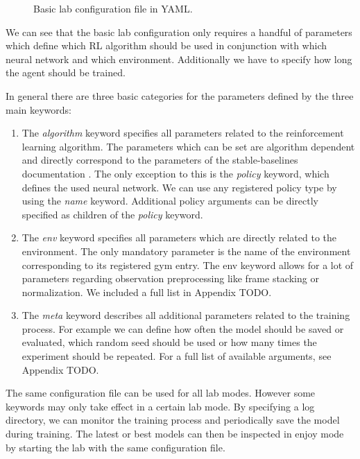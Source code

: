 \begin{figure}[h]
    
    \caption[Basic lab configuration file]{Basic lab configuration file in YAML.}
    \label{fig:BasicLabConfig}
\end{figure}


We can see that the basic lab configuration only requires a handful of parameters which define which RL algorithm should be used in conjunction with which neural network and which environment. Additionally we have to specify how long the agent should be trained. 

In general there are three basic categories for the parameters defined by the three main keywords: 

\begin{enumerate}
    \item The \textit{algorithm} keyword specifies all parameters related to the reinforcement learning algorithm. The parameters which can be set are algorithm dependent and directly correspond to the parameters of the stable-baselines documentation \cite{stable-baselines-docs}. The only exception to this is the \textit{policy} keyword, which defines the used neural network. We can use any registered policy type by using the \textit{name} keyword. Additional policy arguments can be directly specified as children of the \textit{policy} keyword.
    \item The \textit{env} keyword specifies all parameters which are directly related to the environment. The only mandatory parameter is the name of the environment corresponding to its registered gym entry. The env keyword allows for a lot of parameters regarding observation preprocessing like frame stacking or normalization. We included a full list in Appendix TODO. 
    \item  The \textit{meta} keyword describes all additional parameters related to the training process. For example we can define how often the model should be saved or evaluated, which random seed should be used or how many times the experiment should be repeated. For a full list of available arguments, see Appendix TODO.
\end{enumerate}

The same configuration file can be used for all lab modes. However some keywords may only take effect in a certain lab mode. By specifying a log directory, we can monitor the training process and periodically save the model during training. The latest or best models can then be inspected in enjoy mode by starting the lab with the same configuration file. 

